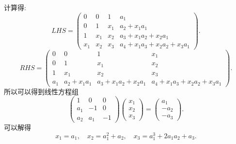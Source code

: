 \documentclass[11pt]{ctexart}
\theoremstyle{definition}
\numberwithin{equation}{section}
\begin{document}
\begin{aaa}
    计算得:
    $$LHS=\begin{pmatrix}
        0&0&1&a_1\\0&1&x_1&a_2+x_1a_1\\1&x_1&x_2&a_3+x_1a_2+x_2a_1\\x_1&x_2&x_3&a_4+x_1a_3+x_2a_2+x_3a_1
    \end{pmatrix}.$$
    $$RHS=\begin{pmatrix}
        0&0&1&x_1\\0&1&x_1&x_2\\1&x_1&x_2&x_3\\a_1&a_2+x_1a_1&a_3+x_1a_2+x_2a_1&a_4+x_1a_3+x_2a_2+x_3a_1
    \end{pmatrix}.$$
    所以可以得到线性方程组$$
    \begin{pmatrix}
        1&0&0\\a_1&-1&0\\a_2&a_1&-1
    \end{pmatrix}
    \begin{pmatrix}
        x_1\\x_2\\x_3
    \end{pmatrix}
    =\begin{pmatrix}
        a_1\\-a_2\\-a_3
    \end{pmatrix}.$$
    可以解得$$x_1=a_1,\quad x_2=a_1^2+a_2,\quad x_3=a_1^3+2a_1a_2+a_3.$$
\end{aaa}
\end{document}
